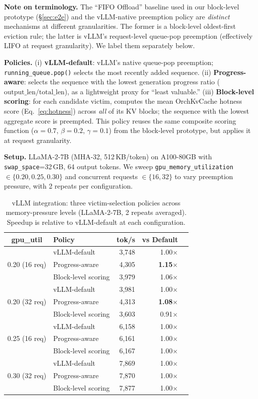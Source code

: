 \documentclass[conference]{IEEEtran}
\begin{document}
\textbf{Note on terminology.} The ``FIFO Offload'' baseline used in our block-level prototype (\S\ref{sec:e2e}) and the vLLM-native preemption policy are \emph{distinct} mechanisms at different granularities. The former is a block-level oldest-first eviction rule; the latter is vLLM's request-level queue-pop preemption (effectively LIFO at request granularity). We label them separately below.

\textbf{Policies.} (i) \textbf{vLLM-default}: vLLM's native queue-pop preemption; \texttt{running\_queue.pop()} selects the most recently added sequence. (ii) \textbf{Progress-aware}: selects the sequence with the lowest generation progress ratio ($\text{output\_len} / \text{total\_len}$), as a lightweight proxy for ``least valuable.'' (iii) \textbf{Block-level scoring}: for each candidate victim, computes the mean OrchKvCache hotness score (Eq.~\ref{eq:hotness}) across \emph{all} of its KV blocks; the sequence with the lowest aggregate score is preempted. This policy reuses the same composite scoring function ($\alpha{=}0.7$, $\beta{=}0.2$, $\gamma{=}0.1$) from the block-level prototype, but applies it at request granularity.

\textbf{Setup.} LLaMA-2-7B (MHA-32, 512\,KB/token) on A100-80GB with \texttt{swap\_space}=32\,GB, 64 output tokens. We sweep \texttt{gpu\_memory\_utilization} $\in \{0.20, 0.25, 0.30\}$ and concurrent requests $\in \{16, 32\}$ to vary preemption pressure, with 2 repeats per configuration.

\begin{table}[t]
\centering
\caption{vLLM integration: three victim-selection policies across memory-pressure levels (LLaMA-2-7B, 2 repeats averaged). Speedup is relative to vLLM-default at each configuration.}
\label{tab:vllm-block}
\small
\begin{tabular}{@{}clrrr@{}}
\toprule
gpu\_util & Policy & tok/s & vs Default \\
\midrule
\multirow{3}{*}{0.20 (16 req)}
& vLLM-default       & 3{,}748 & 1.00$\times$ \\
& Progress-aware     & 4{,}305 & \textbf{1.15$\times$} \\
& Block-level scoring & 3{,}979 & 1.06$\times$ \\
\midrule
\multirow{3}{*}{0.20 (32 req)}
& vLLM-default       & 3{,}981 & 1.00$\times$ \\
& Progress-aware     & 4{,}313 & \textbf{1.08$\times$} \\
& Block-level scoring & 3{,}603 & 0.91$\times$ \\
\midrule
\multirow{3}{*}{0.25 (16 req)}
& vLLM-default       & 6{,}158 & 1.00$\times$ \\
& Progress-aware     & 6{,}161 & 1.00$\times$ \\
& Block-level scoring & 6{,}167 & 1.00$\times$ \\
\midrule
\multirow{3}{*}{0.30 (32 req)}
& vLLM-default       & 7{,}869 & 1.00$\times$ \\
& Progress-aware     & 7{,}870 & 1.00$\times$ \\
& Block-level scoring & 7{,}877 & 1.00$\times$ \\
\bottomrule
\end{tabular}
\end{table}
\end{document}
